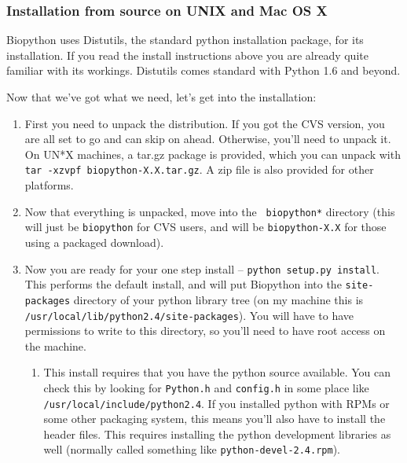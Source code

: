\documentclass{article}
\begin{document}
\subsubsection{Installation from source on UNIX and Mac OS X}

Biopython uses Distutils, the standard python installation package, for
its installation. If you read the install instructions above you are
already quite familiar with its workings. Distutils comes standard with 
Python 1.6 and beyond.

Now that we've got what we need, let's get into the installation:

\begin{enumerate}

\item First you need to unpack the distribution. If you got the CVS version, you are all set to go and can skip on ahead. Otherwise, you'll need to unpack it. On UN*X machines, a tar.gz package is provided, which you can unpack with \verb|tar -xzvpf biopython-X.X.tar.gz|. A zip file is also provided for other platforms.

\item Now that everything is unpacked, move into the \verb| biopython*| directory (this will just be \verb|biopython| for CVS users, and will be \verb|biopython-X.X| for those using a packaged download). 

\item Now you are ready for your one step install -- \verb|python setup.py install|. This performs the default install, and will put Biopython into the \verb|site-packages| directory of your python library tree (on my machine this is \verb|/usr/local/lib/python2.4/site-packages|). You will have to have permissions to write to this directory, so you'll need to have root access on the machine.

\begin{enumerate}

\item This install requires that you have the python source available. You can check this by looking for \verb|Python.h| and \verb|config.h| in some place like \verb|/usr/local/include/python2.4|. If you installed python with RPMs or 
some other packaging system, this means you'll also have to install the
header files. This requires installing the python development libraries
as well (normally called something like \verb|python-devel-2.4.rpm|).


\end{enumerate}
\end{enumerate}
\end{document}

